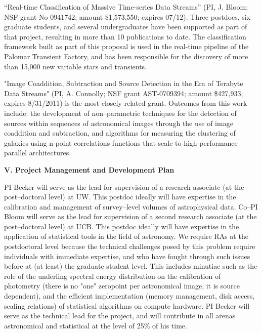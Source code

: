  \smallskip

``Real-time Classification of Massive Time-series Data Streams'' (PI, J. Bloom;
NSF grant No 0941742; amount \$1,573,550; expires 07/12).  Three postdocs, six
graduate students, and several undergraduates have been supported as part of
that project, resulting in more than 10 publications to date.  The
classification framework built as part of this proposal is used in the real-time
pipeline of the Palomar Transient Factory, and has been responsible for the
discovery of more than 15,000 new variable stars and transients.

 \smallskip

"Image Coaddition, Subtraction and Source Detection in the Era of Terabyte Data
Streams" (PI, A. Connolly; NSF grant AST-0709394; amount \$427,933; expires
8/31/2011) is the most closely related grant.  Outcomes from this work include:
the development of non--parametric techniques for the detection of sources
within sequences of astronomical images through the use of image coaddition and
subtraction, and algorithms for measuring the clustering of galaxies using
n-point correlations functions that scale to high-performance parallel
architectures.


\bigskip \centerline{\bf V. Project Management and Development Plan} \smallskip

PI Becker will serve as the lead for supervision of a research associate (at the
post--doctoral level) at UW.  This postdoc ideally will have expertise in the
calibration and management of survey--level volumes of astrophysical data.
Co--PI Bloom will serve as the lead for supervision of a second research
associate (at the post--doctoral level) at UCB.  This postdoc ideally will have
expertise in the application of statistical tools in the field of astronomy.  We
require RAs at the postdoctoral level because the technical challenges posed by
this problem require individuals with immediate expertise, and who have fought
through such issues before at (at least) the graduate student level. This
includes minutiae such as the role of the underling spectral energy distribution
on the calibration of photometry (there is no "one" zeropoint per astronomical
image, it is source dependent), and the efficient implementation (memory
management, disk access, scaling relations) of statistical algorithms on compute
hardware. PI Becker will serve as the technical lead for the project, and will
contribute in all arenas astronomical and statistical at the level of 25\% of
his time.

